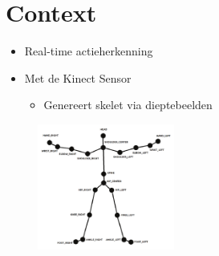 \documentclass[]{beamer}
\begin{document}
	\section{Context}
	\begin{frame}
		\begin{itemize}
			\item Real-time actieherkenning
			\item Met de Kinect Sensor
			\begin{itemize}
				\item Genereert skelet via dieptebeelden
			\end{itemize}
		\end{itemize}
		\begin{figure}
			\centering
			\includegraphics[width=0.4\textwidth]{skeleton}
		\end{figure}
	\end{frame}
\end{document}
